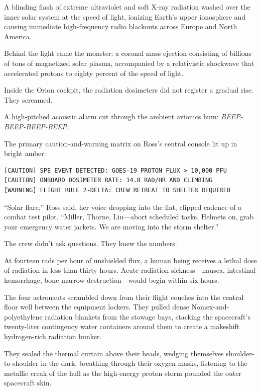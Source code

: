 \documentclass[12pt,twoside,openright]{book}
\begin{document}
A blinding flash of extreme ultraviolet and soft X-ray radiation washed
over the inner solar system at the speed of light, ionizing Earth's
upper ionosphere and causing immediate high-frequency radio blackouts
across Europe and North America.

Behind the light came the monster: a coronal mass ejection consisting of
billions of tons of magnetized solar plasma, accompanied by a
relativistic shockwave that accelerated protons to eighty percent of the
speed of light.

Inside the Orion cockpit, the radiation dosimeters did not register a
gradual rise. They screamed.

A high-pitched acoustic alarm cut through the ambient avionics hum:
\emph{BEEP-BEEP-BEEP-BEEP}.

The primary caution-and-warning matrix on Ross's central console lit up
in bright amber:

\begin{lstlisting}
[CAUTION] SPE EVENT DETECTED: GOES-19 PROTON FLUX > 10,000 PFU
[CAUTION] ONBOARD DOSIMETER RATE: 14.8 RAD/HR AND CLIMBING
[WARNING] FLIGHT RULE 2-DELTA: CREW RETREAT TO SHELTER REQUIRED
\end{lstlisting}

``Solar flare,'' Ross said, her voice dropping into the flat, clipped
cadence of a combat test pilot. ``Miller, Thorne, Liu---abort scheduled
tasks. Helmets on, grab your emergency water jackets. We are moving into
the storm shelter.''

The crew didn't ask questions. They knew the numbers.

At fourteen rads per hour of unshielded flux, a human being receives a
lethal dose of radiation in less than thirty hours. Acute radiation
sickness---nausea, intestinal hemorrhage, bone marrow
destruction---would begin within six hours.

The four astronauts scrambled down from their flight couches into the
central floor well between the equipment lockers. They pulled dense
Nomex-and-polyethylene radiation blankets from the stowage bays,
stacking the spacecraft's twenty-liter contingency water containers
around them to create a makeshift hydrogen-rich radiation bunker.

They sealed the thermal curtain above their heads, wedging themselves
shoulder-to-shoulder in the dark, breathing through their oxygen masks,
listening to the metallic creak of the hull as the high-energy proton
storm pounded the outer spacecraft skin.
\end{document}

